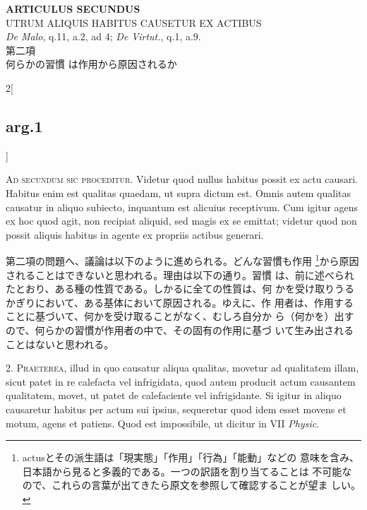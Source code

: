 \documentclass[paper=a4paper,fontsize=10pt,jafontsize=9pt,titlepage]{jlreq}
\begin{document}
\begin{center}
{\Large {\bfseries ARTICULUS SECUNDUS}}\\ {\large UTRUM ALIQUIS HABITUS
CAUSETUR EX ACTIBUS}\\ {\footnotesize {\itshape De Malo}, q.11, a.2,
ad 4; {\itshape De Virtut.}, q.1, a.9.}\\ {\Large 第二項\\何らかの習慣
は作用から原因されるか}
\end{center}

\begin{paracol}{2}[\subsection{arg.1}]

{\scshape Ad secundum sic proceditur}. Videtur quod nullus habitus
possit ex actu causari. Habitus enim est qualitas quaedam, ut supra
dictum est. Omnis autem qualitas causatur in aliquo subiecto,
inquantum est alicuius receptivum. Cum igitur agens ex hoc quod agit,
non recipiat aliquid, sed magis ex se emittat; videtur quod non possit
aliquis habitus in agente ex propriis actibus generari.

\switchcolumn

第二項の問題へ、議論は以下のように進められる。どんな習慣も作用
\footnote{actusとその派生語は「現実態」「作用」「行為」「能動」などの
意味を含み、日本語から見ると多義的である。一つの訳語を割り当てることは
不可能なので、これらの言葉が出てきたら原文を参照して確認することが望ま
しい。}から原因されることはできないと思われる。理由は以下の通り。習慣
は、前に述べられたとおり、ある種の性質である。しかるに全ての性質は、何
かを受け取りうるかぎりにおいて、ある基体において原因される。ゆえに、作
用者は、作用することに基づいて、何かを受け取ることがなく、むしろ自分か
ら（何かを）出すので、何らかの習慣が作用者の中で、その固有の作用に基づ
いて生み出されることはないと思われる。


2. {\scshape Praeterea}, illud in quo causatur aliqua qualitas,
movetur ad qualitatem illam, sicut patet in re calefacta vel
infrigidata, quod autem producit actum causantem qualitatem, movet, ut
patet de calefaciente vel infrigidante. Si igitur in aliquo causaretur
habitus per actum sui ipsius, sequeretur quod idem esset movens et
motum, agens et patiens. Quod est impossibile, ut dicitur in VII
{\itshape Physic}.


\end{paracol}
\end{document}
